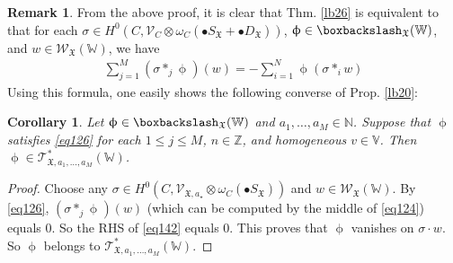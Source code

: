 \documentclass[11pt,b5paper,notitlepage]{article}
\theoremstyle{definition}
\newtheorem{rem}[df]{Remark}
\theoremstyle{plain}
\newtheorem{co}[df]{Corollary}
\newcommand{\fk}{\mathfrak}
\newcommand{\scr}{\mathscr}
\newcommand{\SX}{{S_{\fk X}}}
\newcommand{\DX}{D_{\fk X}}
\newcommand{\blt}{\bullet}
\newcommand{\Vbb}{\mathbb V}
\newcommand{\Wbb}{\mathbb W}
\newcommand{\Nbb}{\mathbb N}
\newcommand{\Zbb}{\mathbb Z}
\newcommand{\<}{\left\langle}
\renewcommand{\>}{\right\rangle}
\newcommand{\fx}{\mathfrak{X}}
\newcommand{\bbs}{\boxbackslash}
\numberwithin{equation}{subsection}
\begin{document}
\begin{rem}\label{lb64}
From the above proof, it is clear that Thm. \ref{lb26} is equivalent to that for each $\sigma\in H^0(C,\scr V_C\otimes\omega_C(\blt \SX+\blt\DX))$, $\upphi\in\bbs_\fx(\Wbb)$, and $w\in \scr W_\fx(\Wbb)$, we have
\begin{align}
\sum_{j=1}^M (\sigma*_j\upphi)(w)=-\sum_{i=1}^N \upphi(\sigma*_i w)  \label{eq142}
\end{align}
Using this formula, one easily shows the following converse of Prop. \ref{lb20}:
\end{rem}

\begin{co}\label{lb63}
Let $\upphi\in\bbs_\fx(\Wbb)$ and $a_1,\dots,a_M\in\Nbb$. Suppose that $\upphi$ satisfies \eqref{eq126} for each $1\leq j\leq M$, $n\in\Zbb$, and homogeneous $v\in \Vbb$. Then $\upphi\in\scr T_{\fx,a_1,\dots,a_M}^*(\Wbb)$.
\end{co}

\begin{proof}
Choose any $\sigma\in H^0(C,\scr V_{\fx,a_\star}\otimes\omega_C(\blt\SX))$ and $w\in\scr W_\fx(\Wbb)$. By \eqref{eq126}, $(\sigma*_j\upphi)(w)$ (which can be computed by the middle of \eqref{eq124}) equals $0$. So the RHS of \eqref{eq142} equals $0$. This proves that $\upphi$ vanishes on $\sigma\cdot w$. So $\upphi$ belongs to $\scr T_{\fx,a_1,\dots,a_M}^*(\Wbb)$.
\end{proof}
\end{document}
